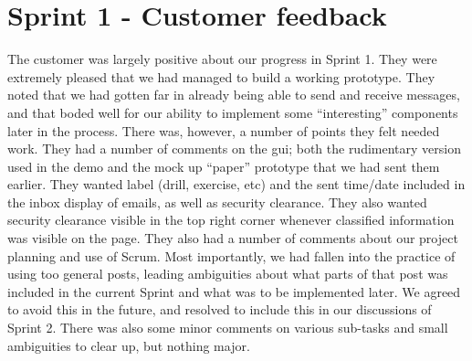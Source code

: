 \section{Sprint 1 - Customer feedback}

The customer was largely positive about our progress in Sprint 1. They were extremely pleased that we had managed to build a working prototype. They noted that we had gotten far in already being able to send and receive messages, and that boded well for our ability to implement some “interesting” components later in the process.
\newline
\newline
There was, however, a number of points they felt needed work. They had a number of comments on the \gls{gui}; both the rudimentary version used in the demo and the mock up “paper” prototype that we had sent them earlier. They wanted label (drill, exercise, etc) and the sent time/date included in the inbox display of emails, as well as security clearance. They also wanted security clearance visible in the top right corner whenever classified information was visible on the page. 
\newline
\newline
They also had a number of comments about our project planning and use of Scrum. Most importantly, we had fallen into the practice of using too general posts, leading ambiguities about what parts of that post was included in the current Sprint and what was to be implemented later. We agreed to avoid this in the future, and resolved to include this in our discussions of Sprint 2. There was also some minor comments on various sub-tasks and small ambiguities to clear up, but nothing major.